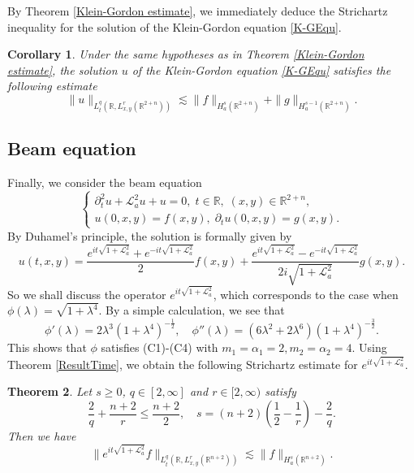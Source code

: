 \documentclass[a4paper,11pt, reqno]{amsart}
\numberwithin{equation}{section}
\theoremstyle{plain}
\newtheorem{theorem}{Theorem}[section]
\newtheorem{corollary}[theorem]{Corollary}
\theoremstyle{definition}
\theoremstyle{remark}
\begin{document}
By Theorem \ref{Klein-Gordon estimate}, we immediately deduce the Strichartz inequality for the solution of the Klein-Gordon equation \eqref{K-GEqu}. 
\begin{corollary}
Under the same hypotheses as in Theorem \ref{Klein-Gordon estimate}, the solution $u$ of the Klein-Gordon equation \eqref{K-GEqu} satisfies the following estimate
	\begin{equation*}
	\|u\|_{L_t^q(\mathbb{R},L^r_{x,y}(\mathbb{R}^{2+n}))}\lesssim \|f\|_{H^s_a(\mathbb{R}^{2+n})}+\|g\|_{H^{s-1}_a(\mathbb{R}^{2+n})}.
	\end{equation*}
\end{corollary}

 \subsection{Beam equation}
Finally, we consider the beam equation
\begin{equation}\label{BeamEqu}
	\begin{cases}
	\partial_t^2u+\mathcal{L}^2_a u+u=0,\;t\in\mathbb{R},\; (x,y)\in\mathbb{R}^{2+n},\\
	u(0,x,y)=f(x,y),\; \partial_tu(0,x,y)=g(x,y).
	\end{cases}
	\end{equation}
By Duhamel's principle, the solution is formally given by
\begin{equation*}
	u(t,x,y)=\frac{e^{it\sqrt{1+\mathcal{L}^2_a}}+e^{-it\sqrt{1+\mathcal{L}^2_a}}}{2}f(x,y)+\frac{e^{it\sqrt{1+\mathcal{L}^2_a}}-e^{-it\sqrt{1+\mathcal{L}^2_a}}}{2i\sqrt{1+\mathcal{L}^2_a}}g(x,y).
	\end{equation*}
So we shall discuss the operator $e^{it\sqrt{1+\mathcal{L}^2_a}}$, which corresponds to the case when $\phi(\lambda)=\sqrt{1+\lambda^4}$.
By a simple calculation, we see that
	\begin{equation*}
	\phi'(\lambda)=2\lambda^3(1+\lambda^4)^{-\frac{1}{2}}, \quad
	\phi''(\lambda)=(6\lambda^2+2\lambda^6)(1+\lambda^4)^{-\frac{3}{2}}.
	\end{equation*}
This shows that $\phi$ satisfies (C1)-(C4) with $m_1=\alpha_1=2, m_2=\alpha_2=4$.  Using  Theorem \ref{ResultTime}, we obtain the following Strichartz estimate for $e^{it\sqrt{1+\mathcal{L}^2_a}}$.
\begin{theorem}\label{Beam estimate}
Let $s\geq 0$, $q\in [2,\infty]$ and  $r\in [2,\infty)$ satisfy
\begin{equation*}
\frac{2}{q}+\frac{n+2}{r}\leq \frac{n+2}{2},\quad s=(n+2)\left(\frac{1}{2}-\frac{1}{r}\right)-\frac{2}{q}.
\end{equation*}
Then we have
\begin{equation*}
\|e^{it\sqrt{1+\mathcal{L}^2_a}}f\|_{L_t^q(\mathbb{R},L^r_{x,y}(\mathbb{R}^{n+2}))}\lesssim \|f\|_{H^s_a(\mathbb{R}^{n+2})}.
\end{equation*}
\end{theorem}
\end{document}
